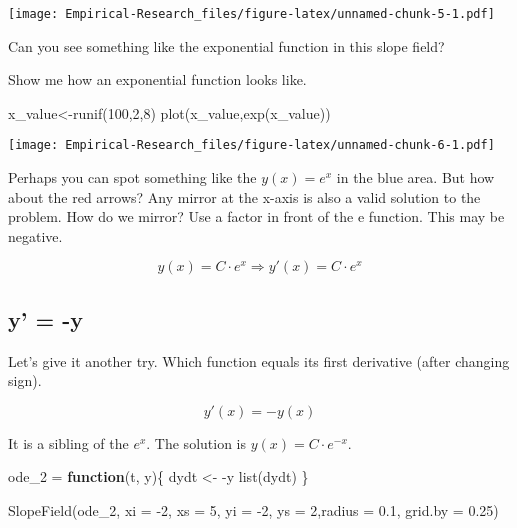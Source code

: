 \documentclass[
]{book}
\newenvironment{Shaded}{\begin{snugshade}}{\end{snugshade}}
\newcommand{\AttributeTok}[1]{\textcolor[rgb]{0.77,0.63,0.00}{#1}}
\newcommand{\ControlFlowTok}[1]{\textcolor[rgb]{0.13,0.29,0.53}{\textbf{#1}}}
\newcommand{\DecValTok}[1]{\textcolor[rgb]{0.00,0.00,0.81}{#1}}
\newcommand{\FloatTok}[1]{\textcolor[rgb]{0.00,0.00,0.81}{#1}}
\newcommand{\FunctionTok}[1]{\textcolor[rgb]{0.00,0.00,0.00}{#1}}
\newcommand{\NormalTok}[1]{#1}
\newcommand{\OtherTok}[1]{\textcolor[rgb]{0.56,0.35,0.01}{#1}}
\newcommand{\SpecialCharTok}[1]{\textcolor[rgb]{0.00,0.00,0.00}{#1}}
\begin{document}
\texttt{[image: Empirical-Research\_files/figure-latex/unnamed-chunk-5-1.pdf]}

Can you see something like the exponential function in this slope field?

Show me how an exponential function looks like.

\begin{Shaded}
\begin{Highlighting}[]
\NormalTok{x\_value}\OtherTok{\textless{}{-}}\FunctionTok{runif}\NormalTok{(}\DecValTok{100}\NormalTok{,}\DecValTok{2}\NormalTok{,}\DecValTok{8}\NormalTok{)}
\FunctionTok{plot}\NormalTok{(x\_value,}\FunctionTok{exp}\NormalTok{(x\_value))}
\end{Highlighting}
\end{Shaded}

\texttt{[image: Empirical-Research\_files/figure-latex/unnamed-chunk-6-1.pdf]}

Perhaps you can spot something like the \(y(x) = e^x\) in the blue area. But how about the red arrows? Any mirror at the x-axis is also a valid solution to the problem. How do we mirror? Use a factor in front of the e function. This may be negative.

\[y(x) = C \cdot e^x \Rightarrow y'(x) = C \cdot e^x \]

\hypertarget{y--y}{%
\subsection{y' = -y}\label{y--y}}

Let's give it another try. Which function equals its first derivative (after changing sign).

\[y'(x) = -y(x)\]

It is a sibling of the \(e^x\). The solution is \(y(x) = C \cdot e^{-x}\).

\begin{Shaded}
\begin{Highlighting}[]
\NormalTok{ode\_2 }\OtherTok{=} \ControlFlowTok{function}\NormalTok{(t, y)\{}
\NormalTok{  dydt }\OtherTok{\textless{}{-}} \SpecialCharTok{{-}}\NormalTok{y}
  \FunctionTok{list}\NormalTok{(dydt)}
\NormalTok{\}}

\FunctionTok{SlopeField}\NormalTok{(ode\_2, }\AttributeTok{xi =} \SpecialCharTok{{-}}\DecValTok{2}\NormalTok{, }\AttributeTok{xs =} \DecValTok{5}\NormalTok{, }\AttributeTok{yi =} \SpecialCharTok{{-}}\DecValTok{2}\NormalTok{, }\AttributeTok{ys =} \DecValTok{2}\NormalTok{,}\AttributeTok{radius =} \FloatTok{0.1}\NormalTok{, }\AttributeTok{grid.by =} \FloatTok{0.25}\NormalTok{)}
\end{Highlighting}
\end{Shaded}
\end{document}
